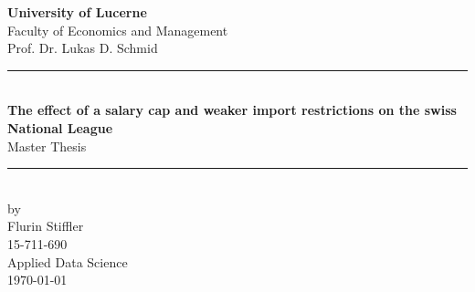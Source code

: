 \begin{titlepage}
  \begin{center}
    
    \huge \textbf{University of Lucerne}\\
    \LARGE Faculty of Economics and Management\\
    \LARGE Prof. Dr. Lukas D. Schmid\\
    \vfill
    \rule{\linewidth}{2pt}\\
    \Huge \textbf{The effect of a salary cap and weaker import restrictions on the swiss National League}\\
    \vspace{0.5cm}
    \Huge Master Thesis\\
    \rule{\linewidth}{2pt}\\
    \vfill
    \Large by\\
    \vspace{0.5cm}
    \Large Flurin Stiffler\\
    \Large 15-711-690\\
    \Large Applied Data Science\\
    \Large \today

  \end{center}
\end{titlepage}

